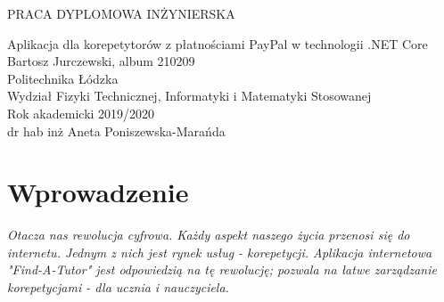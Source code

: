 \documentclass[12pt]{article}
\numberwithin{figure}{section}
\begin{document}
\begin{sloppypar}
\begin{titlepage}
 \thispagestyle{empty}
 \begin{center}
  \vspace{3cm}
  \large
    PRACA DYPLOMOWA INŻYNIERSKA\\
  \vspace{5cm}

  \Huge
    Aplikacja dla korepetytorów z płatnościami PayPal w technologii .NET Core\\
  \large
  \vspace{2cm}
  Bartosz Jurczewski, album 210209\\
  \bigbreak
  Politechnika Łódzka\\
  Wydział Fizyki Technicznej, Informatyki i Matematyki Stosowanej\\
  Rok akademicki 2019/2020\\
  \bigbreak
   dr hab inż Aneta Poniszewska-Marańda \\
 \end{center}
\end{titlepage}

\clearpage
{}
\setcounter{page}{2}
\setcounter{secnumdepth}{3}

\tableofcontents
\pagebreak

\pagebreak
\section{Wprowadzenie}
\textit{Otacza nas rewolucja cyfrowa. Każdy aspekt naszego życia przenosi się do internetu. Jednym z nich jest rynek usług - korepetycji. Aplikacja internetowa "Find-A-Tutor" jest odpowiedzią na tę rewolucję; pozwala na łatwe zarządzanie korepetycjami - dla ucznia i nauczyciela.}

\end{sloppypar}
\end{document}
